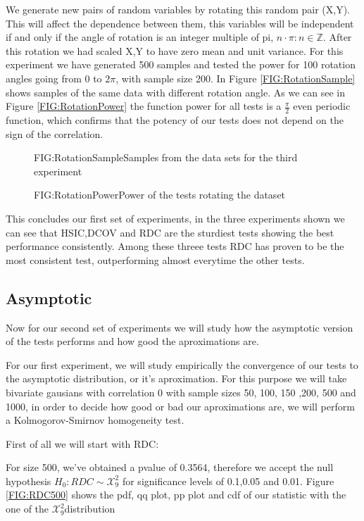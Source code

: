 We generate new pairs of random variables by rotating this random pair (X,Y). This will affect the dependence between them, this variables will be independent if and only if the angle of rotation is an integer multiple of pi, $n\cdot\pi : n\in\mathbb{Z}$. After this rotation we had scaled X,Y to have zero mean and unit variance.
For this experiment we have generated 500 samples and tested the power for 100 rotation angles going from 0 to $2\pi$, with sample size 200. In Figure \ref{FIG:RotationSample} shows samples of the same data with different rotation angle.
As we can see in Figure \ref{FIG:RotationPower} the function power for all tests is a $\frac{\pi}{2}$ even periodic function, which confirms that the potency of our tests does not depend on the sign of the correlation.

\begin{figure}[Experiment 3 rotation pattern sample]{FIG:RotationSample}{Samples from the data sets for the third experiment}
\end{figure}
\begin{figure}[Experiment 3 results]{FIG:RotationPower}{Power of the tests rotating the dataset}
\end{figure}

This concludes our first set of experiments, in the three experiments shown we can see that HSIC,DCOV and RDC are the sturdiest tests showing the best performance consistently. Among these threee tests RDC has proven to be the most consistent test, outperforming almost everytime the other tests. 


\subsection{Asymptotic}

Now for our second set of experiments we will study how the asymptotic version of the tests performs and how good the aproximations are.

For our first experiment, we will study empirically the convergence of our tests to the asymptotic distribution, or it's aproximation. For this purpose we will take  bivariate gausians with correlation 0 with sample sizes  50, 100, 150 ,200, 500 and 1000, in order to decide how good or bad our aproximations are, we will perform a Kolmogorov-Smirnov homogeneity test.

First of all we will start with RDC:

For size 500, we've obtained a pvalue of 0.3564, therefore we accept the null hypothesis $H_{0}: RDC\sim \mathcal{X}^{2}_{9}$ for significance levels of 0.1,0.05 and 0.01. Figure \ref{FIG:RDC500} shows the pdf, qq plot, pp plot and cdf of our statistic with the one of the $\mathcal{X}^{2}_{9}$distribution

